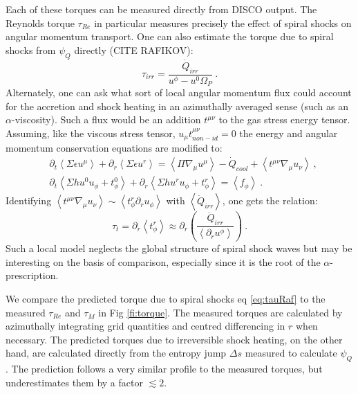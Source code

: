 \documentclass{emulateapj}
\newcommand{\al}{\alpha}
\newcommand{\De}{\Delta}
\newcommand{\eps}{\epsilon}
\newcommand{\Sig}{\Sigma}
\newcommand{\Om}{\Omega}
\newcommand{\ave}[1]{\left \langle #1 \right \rangle}
\begin{document}
Each of these torques can be measured directly from DISCO output.  The Reynolds torque $\tau_{Re}$ in particular measures precisely the effect of spiral shocks on angular momentum transport.  One can also estimate the torque due to spiral shocks from $\psi_Q$ directly (CITE RAFIKOV):
\begin{equation}
	\tau_{irr} = \frac{\dot{Q}_{irr}}{u^\phi - u^0 \Om_P} \ . \label{eq:tauRaf}
\end{equation}
Alternately, one can ask what sort of local angular momentum flux could account for the accretion and shock heating in an azimuthally averaged sense (such as an $\al$-viscosity).  Such a flux would be an addition $t^{\mu\nu}$ to the gas stress energy tensor.  Assuming, like the viscous stress tensor, $u_\mu t^{\mu\nu}_{non-id} = 0$ the energy and angular momentum conservation equations are modified to:
\begin{align}
	&\partial_t \ave{\Sig \eps u^\mu} + \partial_r \ave{\Sig \eps u^r} = \ave{\Pi \nabla_\mu u^\mu} - \dot{Q}_{cool} + \ave{t^{\mu\nu} \nabla_\mu u_\nu} \ ,\\
	&\partial_t \ave{\Sig h u^0 u_\phi + t^0_\phi} + \partial_r \ave{\Sig h u^r u_\phi + t^r_\phi} = \ave{f_\phi} \ .
\end{align}
Identifying $\ave{t^{\mu\nu} \nabla_\mu u_\nu} \sim \ave{t^r_\phi \partial_r u_\phi}$ with $\ave{\dot{Q}_{irr}}$, one gets the relation:
\begin{equation}
	\tau_{t} = \partial_r \ave{t^r_\phi} \approx \partial_r \left(\frac{\dot{Q}_{irr}}{\ave{\partial_r u^\phi}} \right)\ . \label{eq:tauLoc}
\end{equation}
Such a local model neglects the global structure of spiral shock waves but may be interesting on the basis of comparison,  especially since it is the root of the $\alpha$-prescription.

We compare the predicted torque due to spiral shocks eq \eqref{eq:tauRaf} to the measured $\tau_{Re}$ and $\tau_{\dot{M}}$ in Fig \ref{fi:torque}.  The measured torques are calculated by azimuthally integrating grid quantities and centred differencing in $r$ when necessary.  The predicted torques due to irreversible shock heating, on the other hand, are calculated directly from the entropy jump $\De s$ measured to calculate $\psi_Q$.  The prediction follows a very similar profile to the measured torques, but underestimates them by a factor $\lesssim 2$.  

\end{document}
